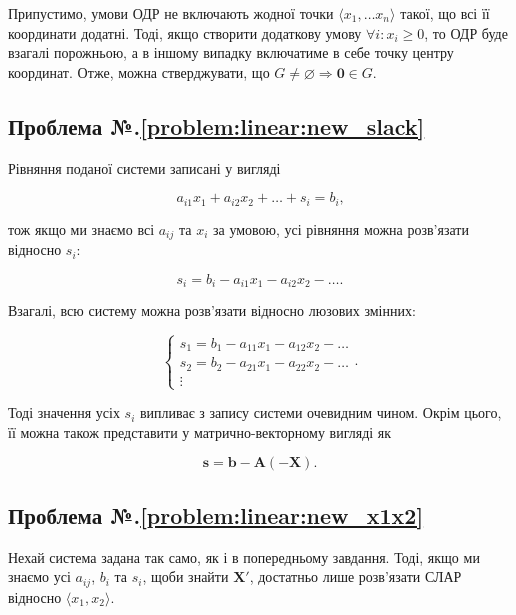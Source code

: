 \documentclass[\main/book.tex]{subfiles}
\begin{document}
Припустимо, умови ОДР не включають жодної точки $\langle x_1, \ldots x_n \rangle$ такої, що всі її координати додатні. Тоді, якщо створити додаткову умову $\forall i: x_i \geq 0$, то ОДР буде взагалі порожньою, а в іншому випадку включатиме в себе точку центру координат. Отже, можна стверджувати, що $G \neq \varnothing \Rightarrow \mathbf{0} \in G$.

\subsection*{Проблема №.\ref{problem:linear:new_slack}}

Рівняння поданої системи записані у вигляді

\[
 a_{i1} x_1 + a_{i2} x_2 + \ldots + s_i = b_i
 \text{,}
\]

тож якщо ми знаємо всі $a_{ij}$ та $x_i$ за умовою, усі рівняння можна розв'язати відносно $s_i$:

\[
 s_i = b_i - a_{i1} x_1 - a_{i2} x_2 - \ldots
 \text{.}
\]

Взагалі, всю систему можна розв'язати відносно люзових змінних:

\[
 \left\{\begin{array}{l}
  s_1 = b_1 - a_{11} x_1 - a_{12} x_2 - \ldots \\
  s_2 = b_2 - a_{21} x_1 - a_{22} x_2 - \ldots \\
  \vdots
 \end{array}\right.
 \text{.}
\]

Тоді значення усіх $s_i$ випливає з запису системи очевидним чином. Окрім цього, її можна також представити у матрично-векторному вигляді як

\[
 \mathbf{s} = \mathbf{b} - \mathbf{A}(-\mathbf{X})
 \text{.}
\]

\subsection*{Проблема №.\ref{problem:linear:new_x1x2}}

Нехай система задана так само, як і в попередньому завдання. Тоді, якщо ми знаємо усі $a_{ij}$, $b_i$ та $s_i$, щоби знайти $\mathbf{X}'$, достатньо лише розв'язати СЛАР відносно $\langle x_1, x_2 \rangle$.
\end{document}
